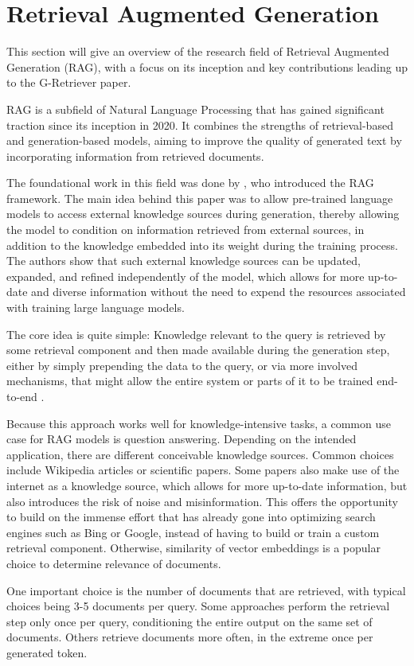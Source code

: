 \section{Retrieval Augmented Generation}

This section will give an overview of the research field of Retrieval Augmented Generation (RAG), with a focus on its inception and key contributions leading up to the G-Retriever paper.

RAG is a subfield of Natural Language Processing that has gained significant traction since its inception in 2020.
It combines the strengths of retrieval-based and generation-based models, aiming to improve the quality of generated text by incorporating information from retrieved documents.

The foundational work in this field was done by \cite{rag}, who introduced the RAG framework.
The main idea behind this paper was to allow pre-trained language models to access external knowledge sources during generation, thereby allowing the model to condition on information retrieved from external sources, in addition to  the knowledge embedded into its weight during the training process.
The authors show that such external knowledge sources can be updated, expanded, and refined independently of the model, which allows for more up-to-date and diverse information without the need to expend the resources associated with training large language models.


The core idea is quite simple: Knowledge relevant to the query is retrieved by some retrieval component and then made available during the generation step, either by simply prepending the data to the query, or via more involved mechanisms, that might allow the entire system or parts of it to be trained end-to-end \cite{in-context}.

Because this approach works well for knowledge-intensive tasks, a common use case for RAG models is question answering.
Depending on the intended application, there are different conceivable knowledge sources.
Common choices include Wikipedia articles or scientific papers.
Some papers also make use of the internet as a knowledge source, which allows for more up-to-date information, but also introduces the risk of noise and misinformation.
This offers the opportunity to build on the immense effort that has already gone into optimizing search engines such as Bing or Google, instead of having to build or train a custom retrieval component.
Otherwise, similarity of vector embeddings is a popular choice to determine relevance of documents.

One important choice is the number of documents that are retrieved, with typical choices being 3-5 documents per query.
Some approaches perform the retrieval step only once per query, conditioning the entire output on the same set of documents. Others retrieve documents more often, in the extreme once per generated token.
